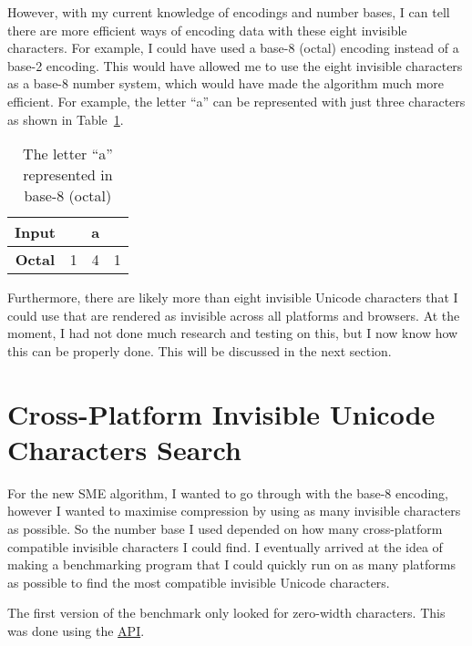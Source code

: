 \documentclass{article}
\begin{document}
However, with my current knowledge of encodings and number bases, I can tell there are more efficient ways of encoding data with these eight invisible characters. For example, I could have used a base-8 (octal) encoding instead of a base-2 encoding. This would have allowed me to use the eight invisible characters as a base-8 number system, which would have made the algorithm much more efficient. For example, the letter ``a'' can be represented with just three characters as shown in Table~\ref{tab:a-base8}.

\begin{table}[H]
  \centering
  \begin{tabular}{cccc}
    \textbf{Input}   & \multicolumn{3}{c}{a} \\ \midrule
    \textbf{Octal}   & 1 & 4 & 1             \\ \midrule
  \end{tabular}
  \caption{The letter ``a'' represented in base-8 (octal)}\label{tab:a-base8}
\end{table}

Furthermore, there are likely more than eight invisible Unicode characters that I could use that are rendered as invisible across all platforms and browsers. At the moment, I had not done much research and testing on this, but I now know how this can be properly done. This will be discussed in the next section.

\section{Cross-Platform Invisible Unicode Characters Search}

For the new SME algorithm, I wanted to go through with the base-8 encoding, however I wanted to maximise compression by using as many invisible characters as possible. So the number base I used depended on how many cross-platform compatible invisible characters I could find. I eventually arrived at the idea of making a benchmarking program that I could quickly run on as many platforms as possible to find the most compatible invisible Unicode characters.

The first version of the benchmark only looked for zero-width characters. This was done using the \href{https://developer.mozilla.org/en-US/docs/Web/API/Element/getBoundingClientRect}{ API}.
\end{document}
